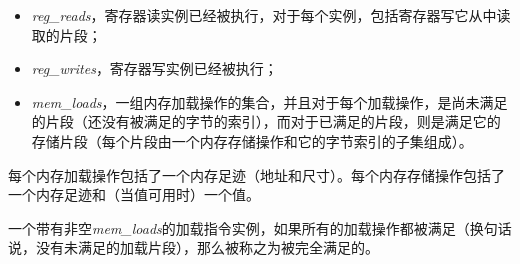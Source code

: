 \begin{itemize}
\item {\it reg\_reads}，寄存器读实例已经被执行，对于每个实例，包括寄存器写它从中读取的片段； %
\item {\it reg\_writes}，寄存器写实例已经被执行； %
\item {\it mem\_loads}，一组内存加载操作的集合，并且对于每个加载操作，是尚未满足的片段（还没有被满足的字节的索引），而对于已满足的片段，则是满足它的存储片段（每个片段由一个内存存储操作和它的字节索引的子集组成）。  %
\end{itemize}

每个内存加载操作包括了一个内存足迹（地址和尺寸）。每个内存存储操作包括了一个内存足迹和（当值可用时）一个值。

一个带有非空{\it mem\_loads}的加载指令实例，如果所有的加载操作都被满足（换句话说，没有未满足的加载片段），那么被称之为被完全满足的。

